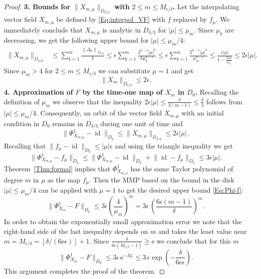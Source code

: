 \documentclass[a4paper,12pt]{article}
\begin{document}
\begin{proof}
{\bf 3. Bounds for $\bigl\|X_{m,\mu}\bigr\|_{D_{\delta/3}}$ with $2\le m\le M_{\epsilon/\delta}$.}
Let the interpolating vector field $X_{m,\mu}$ be defined 
by \eqref{Eq:interpol_VF} with $f$ replaced by $f_\mu$.
We immediately conclude that 
  $X_{m,\mu}$ is analytic in $D_{\delta/3}$
for $|\mu|\le \mu_{m}$. Since $\mu_k$ are decreasing, 
we get  the following upper bound 
for  $|\mu|\le \mu_m/4$:
\[
\begin{split}
 \bigl\|X_{m,\mu}\bigr\|_{D_{\delta/3}}
&
\le\sum_{k=1}^m \frac{ \left\|\Delta_k\right\|_{D_{\delta/3}}}{k}
\le
\epsilon\sum_{k=1}^m \frac
{2^{k-1}|\mu|^k}
{k\mu_{k}^{k-1}} 
\le
\epsilon\sum_{k=1}^m \frac
{2^{k-1}|\mu|^k}
{\mu_{m}^{k-1}} 
\le
\frac{\epsilon |\mu|}{1-\frac{2|\mu|}{\mu_m}}
\le 
2\epsilon |\mu|.
\end{split}
\]
Since $\mu_m>4$ for $2\le m\le M_{\epsilon/\delta}$  we can substitute $\mu=1$ and get
\[
\|X_{m}\|_{D_{\delta/3}}\le 2 \epsilon.
\]
{\bf 4. Approximation of $F$ by the time-one map of $X_{m}$ in $D_0$.}
Recalling the definition of $\mu_m$ we observe that the inequality 
\(
2\epsilon|\mu|
 \le\frac{\delta}{3(m-1)}\le\frac{\delta}{3}
\) follows from $|\mu|\le \mu_m/4$.
Consequently, an orbit of the vector field $X_{m,\mu}$ with an initial condition  in $D_0$ remains in $D_{\delta/3}$ during one unit of time and
$$
\bigl\|\Phi^1_{X_{m,\mu}}-\operatorname{id} \bigr\|_{D_0}\le \|X_{m,\mu}\|_{D_{\delta/3}}\le 2\epsilon|\mu|\,.
$$
Recalling that  $\|f_\mu - \operatorname{id} \|_{D_0} 
 \leq |\mu| \epsilon$ and using the triangle inequality we get
$$
\bigl\|\Phi^1_{X_{m,\mu}}-f_\mu \bigr\|_{D_0}\le \bigl\|\Phi^1_{X_{m,\mu}}-\operatorname{id} \bigr\|_{D_0}+\bigl\|\operatorname{id} -f_\mu \bigr\|_{D_0} \le 
3\epsilon|\mu|.
$$
Theorem~\ref{Thm:formal} implies that
$\Phi^1_{X_{m,\mu}}$ has the same Taylor polynomial of degree $m$ in $\mu$ as the map
 $f_\mu$. Then
the MMP  based on the bound in the disk 
$|\mu|\le \mu_m/4$ can be applied with $\mu=1$ to get the desired upper bound \eqref{Eq:Phi-f}:
\[
\bigl\|\Phi^1_{X_{m}}-F \bigr\|_{D_0}  
\le   3\epsilon \left( \frac{ 4}{\mu_{m}}\right)^{m}
=
 3\epsilon\,\left(  \frac{6\epsilon (m-1)}{\delta}\right)^{m} .
\]
In order to obtain the exponentially small approximation error we note that the right-hand side 
of the last inequality depends on $m$ and takes the least value 
 near  
$m=M_{{\epsilon/\delta}}=\left\lfloor \delta/(6 \mathrm e\epsilon)\right\rfloor+1$.
Since
 \(
\frac{\delta}{6\epsilon (M_{\epsilon/\delta}-1)}
\ge \mathrm e
\)
we conclude that for this $m$
$$
\bigl\|\Phi^1_{X_m}-F \bigr\|_{D_0} 
\le 3 \epsilon \, \mathrm e^{-M_\epsilon} 
\le 3  \,
\epsilon
\exp
\left(-
\frac{\delta}{6\mathrm e \epsilon}
\right).
$$
This argument completes the proof of the theorem.
\end{proof}
\end{document}

